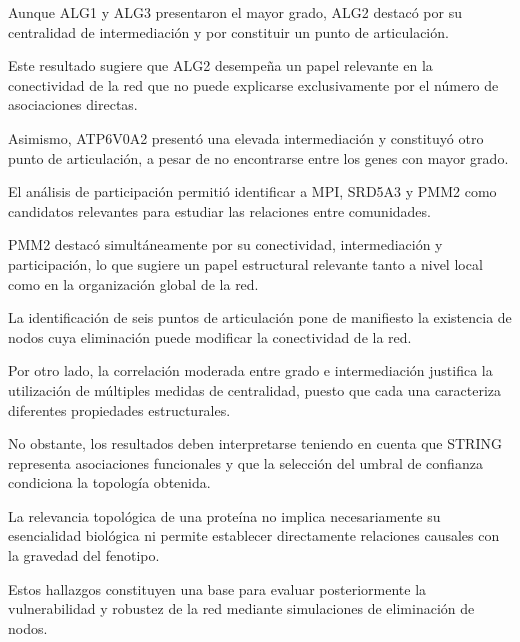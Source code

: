 Aunque ALG1 y ALG3 presentaron el mayor grado,
ALG2 destacó por su centralidad de intermediación
y por constituir un punto de articulación.

Este resultado sugiere que ALG2 desempeña un papel
relevante en la conectividad de la red que no puede
explicarse exclusivamente por el número de
asociaciones directas.

Asimismo, ATP6V0A2 presentó una elevada
intermediación y constituyó otro punto de
articulación, a pesar de no encontrarse entre
los genes con mayor grado.

El análisis de participación permitió identificar
a MPI, SRD5A3 y PMM2 como candidatos relevantes
para estudiar las relaciones entre comunidades.

PMM2 destacó simultáneamente por su conectividad,
intermediación y participación, lo que sugiere
un papel estructural relevante tanto a nivel local
como en la organización global de la red.

La identificación de seis puntos de articulación
pone de manifiesto la existencia de nodos cuya
eliminación puede modificar la conectividad de
la red.

Por otro lado, la correlación moderada entre grado
e intermediación justifica la utilización de
múltiples medidas de centralidad, puesto que
cada una caracteriza diferentes propiedades
estructurales.

No obstante, los resultados deben interpretarse
teniendo en cuenta que STRING representa asociaciones
funcionales y que la selección del umbral de
confianza condiciona la topología obtenida.

La relevancia topológica de una proteína no implica
necesariamente su esencialidad biológica ni permite
establecer directamente relaciones causales con
la gravedad del fenotipo.

Estos hallazgos constituyen una base para evaluar
posteriormente la vulnerabilidad y robustez de la red
mediante simulaciones de eliminación de nodos.
